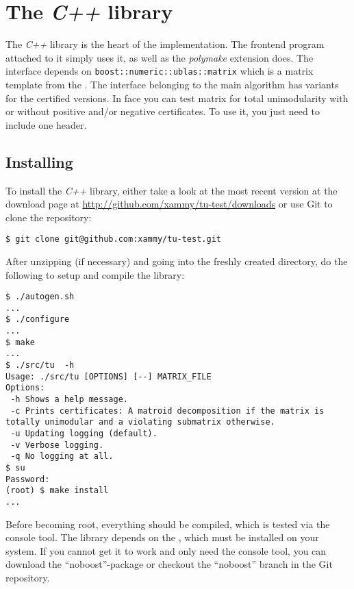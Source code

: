 \documentclass[12pt]{article}
\newcommand{\Cpp}{{\em C++ }}
\newcommand{\Polymake}{{\em polymake }}
\begin{document}
\section{The \Cpp library}

The \Cpp library is the heart of the implementation.
The frontend program attached to it simply uses it, as well as the \Polymake extension does.
The interface depends on {\tt boost::numeric::ublas::matrix} which is a matrix template from the \cite{Boost}.
The interface belonging to the main algorithm has variants for the certified versions. In face you can test matrix
for total unimodularity with or without positive and/or negative certificates. To use it, you just need to include one header.

\subsection{Installing}

To install the \Cpp library, either take a look at the most recent version at the download page at
\url{http://github.com/xammy/tu-test/downloads} or use Git to clone the repository:

{\tiny
{}
\begin{lstlisting}
$ git clone git@github.com:xammy/tu-test.git
\end{lstlisting}}

\parindent 0mm
After unzipping (if necessary) and going into the freshly created directory, do the following to setup and compile the library:

{\tiny
{}
\begin{lstlisting}
$ ./autogen.sh
...
$ ./configure
...
$ make
...
$ ./src/tu  -h
Usage: ./src/tu [OPTIONS] [--] MATRIX_FILE
Options:
 -h Shows a help message.
 -c Prints certificates: A matroid decomposition if the matrix is totally unimodular and a violating submatrix otherwise.
 -u Updating logging (default).
 -v Verbose logging.
 -q No logging at all.
$ su
Password: 
(root) $ make install
...
\end{lstlisting}}

Before becoming root, everything should be compiled, which is tested via the console tool.
The library depends on the \cite{Boost}, which must be installed on your system. If you cannot get it to work and
only need the console tool, you can download the ``noboost''-package or checkout the ``noboost'' branch in the Git repository.
\end{document}
